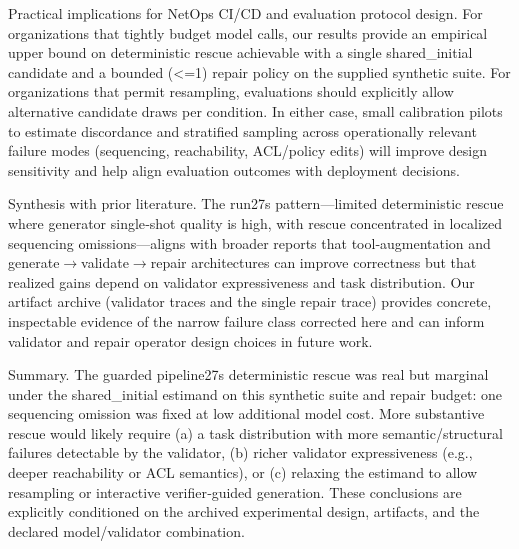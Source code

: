 \documentclass[conference]{IEEEtran}
\begin{document}
Practical implications for NetOps CI/CD and evaluation protocol design. For organizations that tightly budget model calls, our results provide an empirical upper bound on deterministic rescue achievable with a single shared\_initial candidate and a bounded (<=1) repair policy on the supplied synthetic suite. For organizations that permit resampling, evaluations should explicitly allow alternative candidate draws per condition. In either case, small calibration pilots to estimate discordance and stratified sampling across operationally relevant failure modes (sequencing, reachability, ACL/policy edits) will improve design sensitivity and help align evaluation outcomes with deployment decisions.

Synthesis with prior literature. The run 27s pattern---limited deterministic rescue where generator single‑shot quality is high, with rescue concentrated in localized sequencing omissions---aligns with broader reports that tool‑augmentation and generate\ensuremath{\rightarrow}validate\ensuremath{\rightarrow}repair architectures can improve correctness but that realized gains depend on validator expressiveness and task distribution. Our artifact archive (validator traces and the single repair trace) provides concrete, inspectable evidence of the narrow failure class corrected here and can inform validator and repair operator design choices in future work.

Summary. The guarded pipeline 27s deterministic rescue was real but marginal under the shared\_initial estimand on this synthetic suite and repair budget: one sequencing omission was fixed at low additional model cost. More substantive rescue would likely require (a) a task distribution with more semantic/structural failures detectable by the validator, (b) richer validator expressiveness (e.g., deeper reachability or ACL semantics), or (c) relaxing the estimand to allow resampling or interactive verifier‑guided generation. These conclusions are explicitly conditioned on the archived experimental design, artifacts, and the declared model/validator combination.
\end{document}
